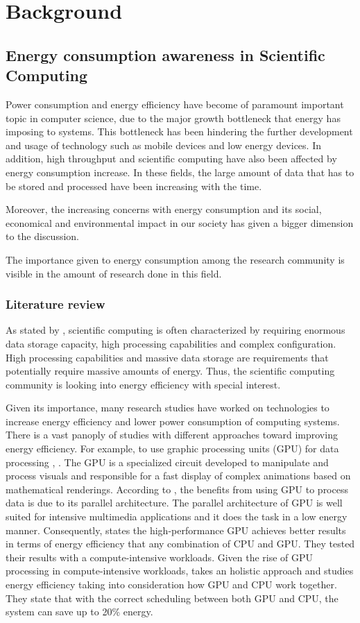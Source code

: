 \chapter{Background}


\section{Energy consumption awareness in Scientific Computing}
Power consumption and energy efficiency have become of paramount important topic in 
computer science, due to the major growth bottleneck that energy has imposing to systems. This bottleneck has been hindering the further development and usage of technology such as mobile devices and low energy devices. In addition, high throughput and scientific computing have also been affected by energy consumption increase. In these fields, the large amount of data that has to be stored and processed have been increasing with the time. 

Moreover, the increasing concerns with energy consumption and its social, economical 
and environmental impact in our society has given a bigger dimension to the discussion.

The importance given to energy consumption among the research community is visible in the amount of research done in this field.

\subsection*{Literature review} %
As stated by \cite{SCICOMPUTING_REQS}, scientific computing is often characterized by requiring enormous data storage capacity, high processing capabilities and complex configuration. High processing capabilities and massive data storage are requirements that potentially require massive amounts of energy. Thus, the scientific 
computing community is looking into energy efficiency with special interest.

Given its importance, many research studies have worked on technologies to increase energy efficiency and lower power consumption of computing systems. There is a vast panoply of studies with different
approaches toward improving energy efficiency. For example, to use graphic processing units (GPU) for data processing \cite{GPU}, \cite{GREENGPU}. The GPU is a specialized circuit developed to manipulate and process visuals and responsible for a fast display of complex animations based on mathematical renderings. According to \cite{GPU}, the benefits from using GPU to process data is due to its parallel architecture. The parallel architecture of GPU is well suited for intensive multimedia applications and it does the task in a low energy manner. Consequently, \cite{GPU} states the high-performance GPU achieves better results in terms of energy efficiency that any combination of CPU and GPU. They tested their results with a compute-intensive workloads. Given the rise of GPU processing in compute-intensive workloads, \cite{GREENGPU} takes an holistic approach and studies energy efficiency taking into consideration how GPU and CPU work together. They state that with the correct scheduling between both GPU and CPU, the system can save up to 20\% energy.  


